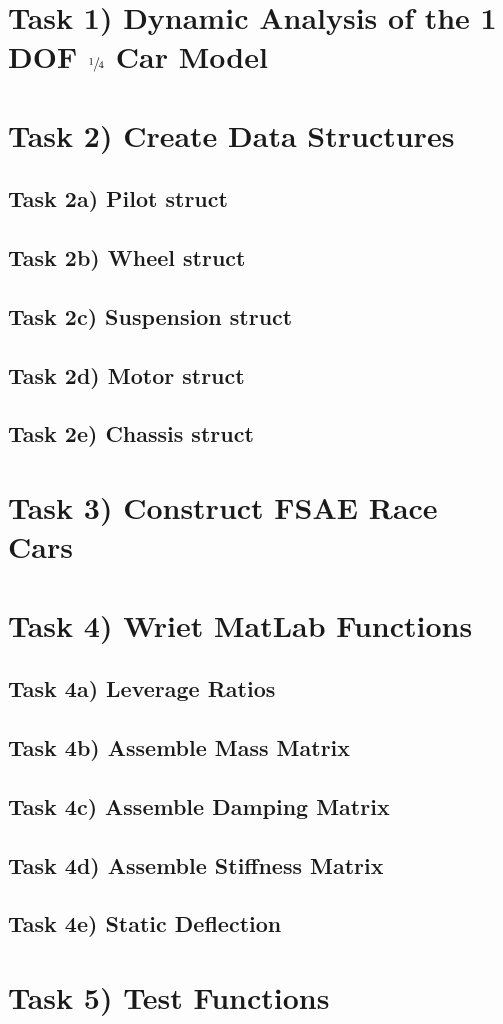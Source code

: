 \section*{Task 1) Dynamic Analysis of the 1 DOF $\sfrac{1}{4}$ Car Model}

\section*{Task 2) Create Data Structures}

\subsection*{Task 2a) Pilot struct}

\subsection*{Task 2b) Wheel struct}

\subsection*{Task 2c) Suspension struct}

\subsection*{Task 2d) Motor struct}

\subsection*{Task 2e) Chassis struct }

\section*{Task 3) Construct FSAE Race Cars}

\section*{Task 4) Wriet MatLab Functions}

\subsection*{Task 4a) Leverage Ratios}

\subsection*{Task 4b) Assemble Mass Matrix}

\subsection*{Task 4c) Assemble Damping Matrix}

\subsection*{Task 4d) Assemble Stiffness Matrix}

\subsection*{Task 4e) Static Deflection}

\section*{Task 5) Test Functions}

